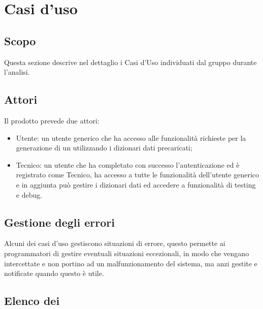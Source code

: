 \section{Casi d'uso}

\subsection{Scopo}
Questa sezione descrive nel dettaglio i Casi d’Uso individuati dal gruppo durante l'analisi.

\subsection{Attori}
Il prodotto prevede due attori:
\begin{itemize}
  \item Utente: un utente generico che ha accesso alle funzionalità richieste per la generazione di un  utilizzando i dizionari dati precaricati;
  \item Tecnico: un utente che ha completato con successo l'autenticazione ed è registrato come Tecnico, ha accesso a tutte le funzionalità dell'utente generico e in aggiunta può gestire i dizionari dati ed accedere a funzionalità di testing e debug.
\end{itemize}

\subsection{Gestione degli errori}
Alcuni dei casi d'uso gestiscono situazioni di errore, questo permette ai programmatori di gestire eventuali situazioni eccezionali, in modo che vengano intercettate e non portino ad un malfunzionamento del sistema, ma anzi gestite e notificate quando questo è utile.

\subsection{Elenco dei }














